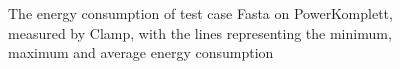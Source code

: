 \begin{figure}
                    \caption{The energy consumption of test case Fasta on PowerKomplett, measured by Clamp, with the lines representing the minimum, maximum and average energy consumption} \label{fig:time_series_Fasta_PowerKomplett_Clamp}
                    \end{figure}
                    